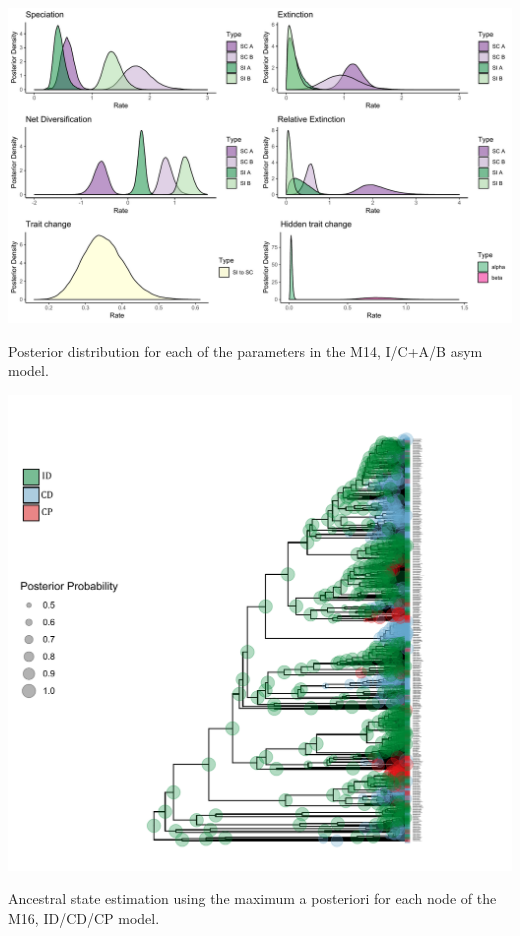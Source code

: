 \begin{suppfigure}
\includegraphics[width=\textwidth]{hisseSIasymposteriordist.pdf}
\caption{Posterior distribution for each of the parameters in the M14, I/C+A/B asym model.} %
\label{suppfigure:ICAB}
\end{suppfigure}

\begin{suppfigure}
\includegraphics[width=\textwidth]{asrIDCDCP.pdf}
\caption{Ancestral state estimation using the maximum a posteriori for each node of the  M16, ID/CD/CP model.} %
\label{suppfigure:IDCDCPnodipasr}
\end{suppfigure}



